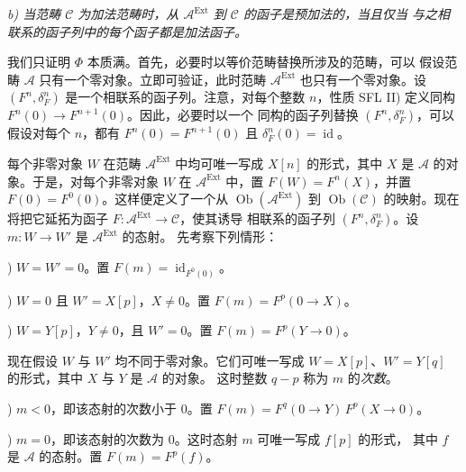 \clearpage
{}%
\begingroup\small\setlength{\parskip}{0pt}\setlength{\emergencystretch}{1.5em}
\setlength{\abovedisplayskip}{4pt plus 2pt minus 2pt}%
\setlength{\belowdisplayskip}{4pt plus 2pt minus 2pt}%

\noindent\textit{b) 当范畴 $\mathcal C$ 为加法范畴时，从
$\mathcal A^{\operatorname{Ext}}$ 到 $\mathcal C$ 的函子是预加法的，当且仅当
与之相联系的函子列中的每个函子都是加法函子。}

我们只证明 $\Phi$ 本质满。首先，必要时以等价范畴替换所涉及的范畴，可以
假设范畴 $\mathcal A$ 只有一个零对象。立即可验证，此时范畴
$\mathcal A^{\operatorname{Ext}}$ 也只有一个零对象。设
$(F^n,\delta_F^n)$ 是一个相联系的函子列。注意，对每个整数 $n$，性质
SFL II) 定义同构 $F^n(0)\longrightarrow F^{n+1}(0)$。因此，必要时以一个
同构的函子列替换 $(F^n,\delta_F^n)$，可以假设对每个 $n$，都有
$F^n(0)=F^{n+1}(0)$ 且 $\delta_F^n(0)=\operatorname{id}$。

每个非零对象 $W$ 在范畴 $\mathcal A^{\operatorname{Ext}}$ 中均可唯一写成
$X[n]$ 的形式，其中 $X$ 是 $\mathcal A$ 的对象。于是，对每个非零对象
$W$ 在 $\mathcal A^{\operatorname{Ext}}$ 中，置
$F(W)=F^n(X)$，并置 $F(0)=F^0(0)$。这样便定义了一个从
$\operatorname{Ob}(\mathcal A^{\operatorname{Ext}})$ 到
$\operatorname{Ob}(\mathcal C)$ 的映射。现在将把它延拓为函子
$F\colon\mathcal A^{\operatorname{Ext}}\longrightarrow\mathcal C$，使其诱导
相联系的函子列 $(F^n,\delta_F^n)$。设
$m\colon W\longrightarrow W'$ 是 $\mathcal A^{\operatorname{Ext}}$ 的态射。
先考察下列情形：

) $W=W'=0$。置 $F(m)=\operatorname{id}_{F^0(0)}$。

) $W=0$ 且 $W'=X[p]$，$X\neq0$。置
$F(m)=F^p(0\longrightarrow X)$。

) $W=Y[p]$，$Y\neq0$，且 $W'=0$。置
$F(m)=F^p(Y\longrightarrow0)$。

现在假设 $W$ 与 $W'$ 均不同于零对象。它们可唯一写成
$W=X[p]$、$W'=Y[q]$ 的形式，其中 $X$ 与 $Y$ 是 $\mathcal A$ 的对象。
这时整数 $q-p$ 称为 $m$ 的\emph{次数}。

) $m<0$，即该态射的次数小于 0。置
$F(m)=F^q(0\longrightarrow Y)\,F^p(X\longrightarrow0)$。

) $m=0$，即该态射的次数为 0。这时态射 $m$ 可唯一写成 $f[p]$ 的形式，
其中 $f$ 是 $\mathcal A$ 的态射。置 $F(m)=F^p(f)$。

